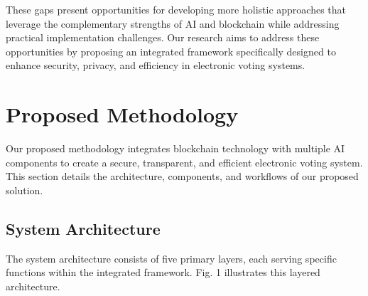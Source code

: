 \documentclass[conference]{IEEEtran}
\begin{document}
These gaps present opportunities for developing more holistic approaches that leverage the complementary strengths of AI and blockchain while addressing practical implementation challenges. Our research aims to address these opportunities by proposing an integrated framework specifically designed to enhance security, privacy, and efficiency in electronic voting systems.

\section{Proposed Methodology}
Our proposed methodology integrates blockchain technology with multiple AI components to create a secure, transparent, and efficient electronic voting system. This section details the architecture, components, and workflows of our proposed solution.

\subsection{System Architecture}
The system architecture consists of five primary layers, each serving specific functions within the integrated framework. Fig. 1 illustrates this layered architecture.
\end{document}
